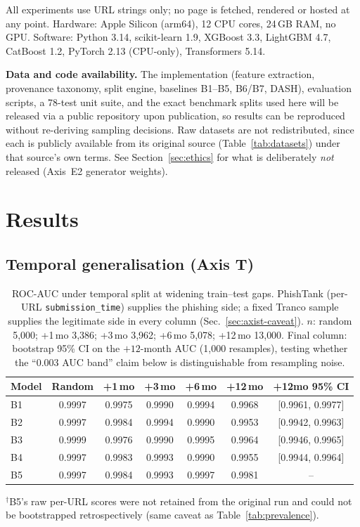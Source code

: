 \documentclass[conference]{IEEEtran}
\begin{document}
All experiments use URL strings only; no page is fetched, rendered or hosted at
any point. Hardware: Apple Silicon (arm64), 12 CPU cores, 24\,GB RAM, no
GPU. Software: Python 3.14, scikit-learn 1.9, XGBoost 3.3, LightGBM 4.7,
CatBoost 1.2, PyTorch 2.13 (CPU-only), Transformers 5.14.

\textbf{Data and code availability.} The implementation (feature
extraction, provenance taxonomy, split engine, baselines B1--B5, B6/B7,
DASH), evaluation scripts, a 78-test unit suite, and the exact benchmark
splits used here will be released via a public repository upon
publication, so results can be reproduced without re-deriving sampling
decisions. Raw datasets are not redistributed, since each is publicly available from
its original source (Table~\ref{tab:datasets}) under that
source's own terms. See Section~\ref{sec:ethics} for what is deliberately
\emph{not} released (Axis~E2 generator weights).

\section{Results}
\label{sec:results}

\subsection{Temporal generalisation (Axis T)}

\begin{table}[t]
\caption{ROC-AUC under temporal split at widening train--test gaps.
PhishTank (per-URL \texttt{submission\_time}) supplies the phishing side;
a fixed Tranco sample supplies the legitimate side in every column
(Sec.~\ref{sec:axist-caveat}). $n$: random 5{,}000; +1\,mo 3{,}386;
+3\,mo 3{,}962; +6\,mo 5{,}078; +12\,mo 13{,}000. Final column: bootstrap
95\% CI on the $+12$-month AUC (1{,}000 resamples), testing whether the
``0.003 AUC band'' claim below is distinguishable from resampling noise.}
\label{tab:axist}
\centering\scriptsize
\setlength{\tabcolsep}{3pt}
\begin{tabular}{@{}lcccccc@{}}
\toprule
\textbf{Model} & \textbf{Random} & \textbf{+1\,mo} & \textbf{+3\,mo} & \textbf{+6\,mo} & \textbf{+12\,mo} & \textbf{+12mo 95\% CI}\\
\midrule
B1 & 0.9997 & 0.9975 & 0.9990 & 0.9994 & 0.9968 & [0.9961, 0.9977]\\
B2 & 0.9997 & 0.9984 & 0.9994 & 0.9990 & 0.9953 & [0.9942, 0.9963]\\
B3 & 0.9999 & 0.9976 & 0.9990 & 0.9995 & 0.9964 & [0.9946, 0.9965]\\
B4 & 0.9997 & 0.9983 & 0.9993 & 0.9990 & 0.9955 & [0.9944, 0.9964]\\
B5 & 0.9997 & 0.9984 & 0.9993 & 0.9997 & 0.9981 & --\rlap{$^\dagger$}\\
\bottomrule
\end{tabular}
\vspace{2pt}
\raggedright\scriptsize
$^\dagger$B5's raw per-URL scores were not retained from the original run
and could not be bootstrapped retrospectively (same caveat as
Table~\ref{tab:prevalence}).
\end{table}
\end{document}
